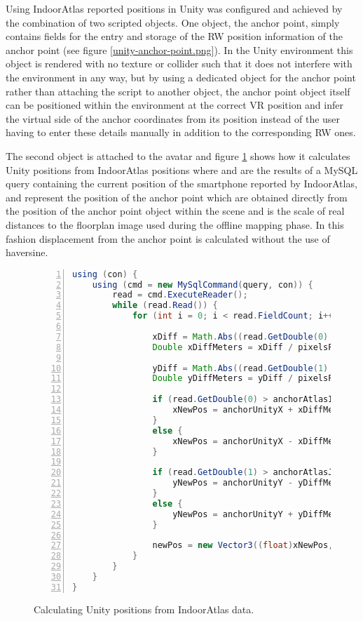 Using IndoorAtlas reported positions in Unity was configured and achieved by the combination of two scripted objects. One object, the anchor point, simply contains fields for the entry and storage of the RW position information of the anchor point (see figure \ref{unity-anchor-point.png}). In the Unity environment this object is rendered with no texture or collider such that it does not interfere with the environment in any way, but by using a dedicated object for the anchor point rather than attaching the script to another object, the anchor point object itself can be positioned within the environment at the correct VR position and infer the virtual side of the anchor coordinates from its position instead of the user having to enter these details manually in addition to the corresponding RW ones.

The second object is attached to the avatar and figure \ref{unity-no-haversine} shows how it calculates Unity positions from IndoorAtlas positions where  and  are the results of a MySQL query containing the current position of the smartphone reported by IndoorAtlas,  and  represent the position of the anchor point which are obtained directly from the position of the anchor point object within the scene and  is the scale of real distances to the floorplan image used during the offline mapping phase. In this fashion displacement from the anchor point is calculated without the use of haversine.

\begin{figure}[h]
\begin{lstlisting}[language=Java, numbers=left, numberstyle=\small, stepnumber=1, frame=single, breaklines=true, backgroundcolor=\color{codebackground}, showstringspaces=false]
using (con) {
    using (cmd = new MySqlCommand(query, con)) {
        read = cmd.ExecuteReader();
        while (read.Read()) {
            for (int i = 0; i < read.FieldCount; i++) {

                xDiff = Math.Abs((read.GetDouble(0) - anchorAtlasI));
                Double xDiffMeters = xDiff / pixelsPerMeter;

                yDiff = Math.Abs((read.GetDouble(1) - anchorAtlasJ));
                Double yDiffMeters = yDiff / pixelsPerMeter;

                if (read.GetDouble(0) > anchorAtlasI) {
                    xNewPos = anchorUnityX + xDiffMeters;
                }
                else {
                    xNewPos = anchorUnityX - xDiffMeters;
                }

                if (read.GetDouble(1) > anchorAtlasJ) {
                    yNewPos = anchorUnityY - yDiffMeters;
                }
                else {
                    yNewPos = anchorUnityY + yDiffMeters;
                }

                newPos = new Vector3((float)xNewPos, (float)transform.position.y, (float)yNewPos);
            }
        }
    }
}
\end{lstlisting}
\caption{Calculating Unity positions from IndoorAtlas data.}
\label{unity-no-haversine}
\end{figure}

